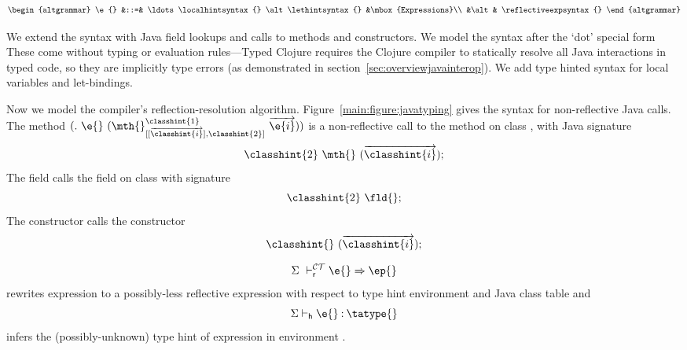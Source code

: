   $$
  \begin{altgrammar}
    \e{} &::=& \ldots   \localhintsyntax{} \alt \lethintsyntax{} &\mbox{Expressions}\\
            &\alt& \reflectiveexpsyntax{} 
  \end{altgrammar}
  $$

We extend the syntax with Java field lookups and calls to
methods and constructors. We model the syntax after the `dot' special
form 
These come without typing or evaluation rules---Typed Clojure 
requires the Clojure compiler to statically resolve all Java interactions
in typed code, so they are implicitly type errors
(as demonstrated in section~\ref{sec:overviewjavainterop}).
We add type hinted syntax for local variables and let-bindings.

Now we model the compiler's reflection-resolution algorithm.
Figure~\ref{main:figure:javatyping} gives the syntax for non-reflective Java calls.
The method ${\methodstaticexp {\classhint{1}}
                             {\overrightarrow {\classhint{i}}}
                             {\classhint{2}}
                             {\mth{}} {\e{}} {\overrightarrow{\e{i}}}}$
is a non-reflective call to the \mth{} method on class {}, 
with Java signature 
$$
{\classhint{2}}\ \mth{}\ (\overrightarrow {\classhint{i}});
$$
The field { {} {\fld{}} {\e{}}}
calls the field on class {} with signature
$$
{\classhint{2}}\ \fld{};
$$
The constructor { {\classhint{}} 
                               {\class{}} {}}
calls the constructor
$$
{\classhint{}}\ ({\overrightarrow{\classhint{i}}});
$$

%


$$
\rewrite {\taenv{}} {\e{}} {\ep{}}
$$
rewrites expression \e{} to a possibly-less reflective expression
\ep{} with respect to type hint environment
\taenv{} and Java class table \ct{} and
$$
\tajudgement {\taenv{}} {\hastype {\e{}} {\tatype{}}}
$$
infers the (possibly-unknown) type hint \tatype{} of expression \e{} in environment \taenv{}.


